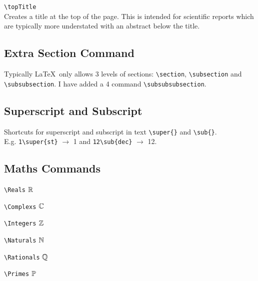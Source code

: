 \documentclass[a4paper, 12pt, english]{article}
\begin{document}
            \verb+\topTitle+\\
            Creates a title at the top of the page. This is intended for scientific reports which are typically more understated with an abstract below the title.


        \subsection{Extra Section Command}
            \label{subsec: extra section command}

            Typically \LaTeX~only allows 3 levels of sections: \verb+\section+, \verb+\subsection+ and \verb+\subsubsection+. I have added a 4 command \verb+\subsubsubsection+.


        \subsection{Superscript and Subscript}
            \label{subsec: superscript and subscript}

            Shortcuts for superscript and subscript in text \verb+\super{}+ and \verb+\sub{}+.\\
            E.g. \verb+1\super{st}+ $\to$ 1 and \verb+12\sub{dec}+ $\to$ 12.


        \subsection{Maths Commands}
            \label{subsec: maths commands}

            \verb+\Reals+ $\mathbb{R}$
            
            \verb+\Complexs+ $\mathbb{C}$
            
            \verb+\Integers+ $\mathbb{Z}$
            
            \verb+\Naturals+ $\mathbb{N}$
            
            \verb+\Rationals+ $\mathbb{Q}$ 

            \verb+\Primes+ $\mathbb{P}$
\end{document}
